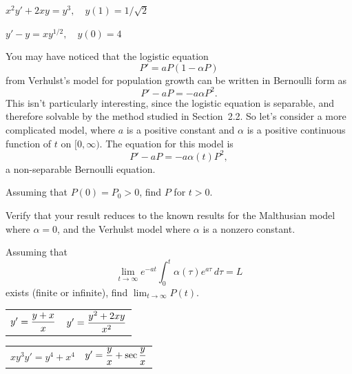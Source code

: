 \begin{exerciselist}

  \item\label{exer:2.4.12} \CGex $x^{2}y'+2xy=y^{3},\quad y(1)=1/\sqrt{2}$

  \item\label{exer:2.4.13} \CGex $y'-y=xy^{1/2},\quad y(0)=4$

  \item\label{exer:2.4.14} You may have noticed that the logistic equation
  \[
    P'=aP(1-\alpha P)
  \]
  from Verhulst's model for population growth can be written in Bernoulli form as
  \[
    P'-aP=-a\alpha P^{2}.
  \]
  This isn't particularly interesting, since the logistic equation is separable, and therefore
  solvable by the method studied in Section~2.2. So let's consider a more complicated model, where
  $a$ is a positive constant and $\alpha$ is a positive continuous function of $t$ on $[0,\infty)$.
  The equation for this model is
  \[
    P'-aP=-a\alpha(t)P^{2},
  \]
  a non-separable Bernoulli equation.
  \begin{alist}
    \item %
    Assuming that $P(0)=P_{0}>0$, find $P$ for $t>0$. 

    \item %
    Verify that your result reduces to the known results for the Malthusian model where $\alpha=0$,
    and the Verhulst model where $\alpha$ is a nonzero constant.

    \item %
    Assuming that
    \[
      \lim_{t\to\infty}e^{-at}\int_{0}^{t}\alpha(\tau)e^{a\tau}\,d\tau=L
    \]
    exists (finite or infinite), find $\lim_{t\to\infty}P(t)$.
  \end{alist}


  \begin{tabular}[t]{@{}p{168pt}@{}p{168pt}}
    \item\label{exer:2.4.15} $y'=\displaystyle\frac{y+x}{x}$ & \vspace*{5pt}
    \item\label{exer:2.4.16} $y'=\displaystyle\frac{y^{2}+2xy}{x^{2}}$
  \end{tabular}

  \begin{tabular}[t]{@{}p{168pt}@{}p{168pt}}
    \item\label{exer:2.4.17} $xy^{3}y'=y^{4}+x^{4}$ &
    \item\label{exer:2.4.18} $y'=\displaystyle\frac{y}{x}+\sec\frac{y}{x}$
  \end{tabular}


\end{exerciselist}
